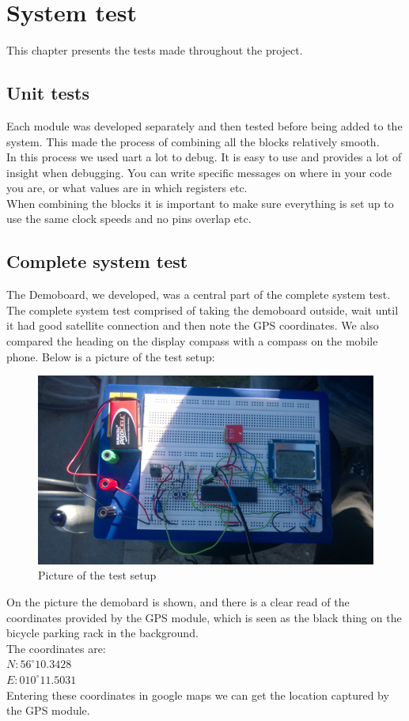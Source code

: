\chapter{System test}
This chapter presents the tests made throughout the project. 

\section{Unit tests}
Each module was developed separately and then tested before being added to the system. This made the process of combining all the blocks relatively smooth.\\
In this process we used uart a lot to debug. It is easy to use and provides a lot of insight when debugging. You can write specific messages on where in your code you are, or what values are in which registers etc.\\
When combining the blocks it is important to make sure everything is set up to use the same clock speeds and no pins overlap etc.

\section{Complete system test}
The Demoboard, we developed, was a central part of the complete system test. The complete system test comprised of taking the demoboard outside, wait until it had good satellite connection and then note the GPS coordinates. We also compared the heading on the display compass with a compass on the mobile phone. Below is a picture of the test setup:
\begin{figure}[H]
\centering
\includegraphics[width=.8\textwidth]{billeder/test_setup}
\caption{Picture of the test setup}
\end{figure}
On the picture the demobard is shown, and there is a clear read of the coordinates provided by the GPS module, which is seen as the black thing on the bicycle parking rack in the background.\\
The coordinates are:\\
$N:56^{\circ}10.3428$\\
$E:010^{\circ}11.5031$\\
Entering these coordinates in google maps we can get the location captured by the GPS module.


